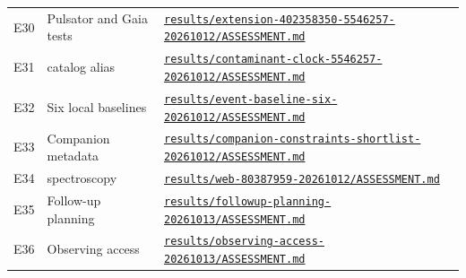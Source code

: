 \begin{longtable}{@{}>{\raggedright\arraybackslash}p{}>{\raggedright\arraybackslash}p{}>{\raggedright\arraybackslash}p{}@{}}
E30 & Pulsator and Gaia tests & \href{https://github.com/relh/exoplanet/blob/0537d585d10e428fad63b4b38f5b9822590b271a/results/extension-402358350-5546257-20261012/ASSESSMENT.md}{\nolinkurl{results/extension-402358350-5546257-20261012/ASSESSMENT.md}} \\
E31 & 554 catalog alias & \href{https://github.com/relh/exoplanet/blob/0537d585d10e428fad63b4b38f5b9822590b271a/results/contaminant-clock-5546257-20261012/ASSESSMENT.md}{\nolinkurl{results/contaminant-clock-5546257-20261012/ASSESSMENT.md}} \\
E32 & Six local baselines & \href{https://github.com/relh/exoplanet/blob/0537d585d10e428fad63b4b38f5b9822590b271a/results/event-baseline-six-20261012/ASSESSMENT.md}{\nolinkurl{results/event-baseline-six-20261012/ASSESSMENT.md}} \\
E33 & Companion metadata & \href{https://github.com/relh/exoplanet/blob/0537d585d10e428fad63b4b38f5b9822590b271a/results/companion-constraints-shortlist-20261012/ASSESSMENT.md}{\nolinkurl{results/companion-constraints-shortlist-20261012/ASSESSMENT.md}} \\
E34 & 803 spectroscopy & \href{https://github.com/relh/exoplanet/blob/0537d585d10e428fad63b4b38f5b9822590b271a/results/web-80387959-20261012/ASSESSMENT.md}{\nolinkurl{results/web-80387959-20261012/ASSESSMENT.md}} \\
E35 & Follow-up planning & \href{https://github.com/relh/exoplanet/blob/0537d585d10e428fad63b4b38f5b9822590b271a/results/followup-planning-20261013/ASSESSMENT.md}{\nolinkurl{results/followup-planning-20261013/ASSESSMENT.md}} \\
E36 & Observing access & \href{https://github.com/relh/exoplanet/blob/0537d585d10e428fad63b4b38f5b9822590b271a/results/observing-access-20261013/ASSESSMENT.md}{\nolinkurl{results/observing-access-20261013/ASSESSMENT.md}} \\
\bottomrule
\end{longtable}
\normalsize
